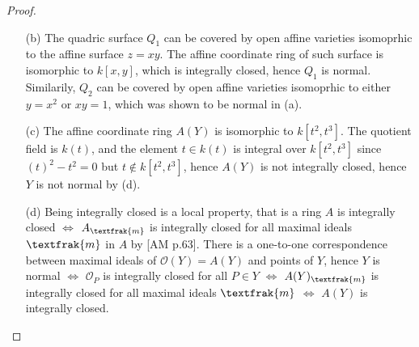\documentclass[12pt]{article}
\newcommand{\goth}[1]{\textfrak{#1}}
\newcommand{\OO}{\mathcal{O}}
\theoremstyle{definition}
\begin{document}
\begin{enumerate} [label=\textbf{\arabic*.}, leftmargin=-0.05em]
\begin{proof}
\begin{itemize}
    Now suppose $\Delta^2 = B^2 - 4AC \neq 0$ and assume $A \neq 0$, then we have
    \begin{equation*}
        f(x, y) = \bigg( \sqrt{A} x + \frac{B + \Delta}{2\sqrt{A}} y \bigg)  \bigg( \sqrt{A} x + \frac{B - \Delta}{2\sqrt{A}} y \bigg) + Dx + Ey + F,
    \end{equation*}
    so we can apply the affine transformation
    \begin{align*}
        \sqrt{A} x + \frac{B + \Delta}{2\sqrt{A}} y & \mapsto x \\
        \sqrt{A} x + \frac{B - \Delta}{2\sqrt{A}} y & \mapsto y
    \end{align*}
    which has determinant $1/\Delta \neq 0$, to obtain
    \begin{equation*}
        f'(x, y) = xy + (\text{linear terms}).
    \end{equation*}

    Since affine coordinate rings are invariant up to affine transformations, we have either $A(X) \simeq R$ or $A(X) \simeq S$. The ring $R = k[x, y] / (y - x^2)$ is isomorphic to a polynomial ring over one variable, which is a factorial, hence it is integrally closed. The ring $S = k[x, \frac{1}{x}]$ is a discrete valuation ring, which are integrally closed by [AM p.94].

    \item[(b)] The quadric surface $Q_1$ can be covered by open affine varieties isomoprhic to the affine surface $z = xy$. The affine coordinate ring of such surface is isomorphic to $k[x, y]$, which is integrally closed, hence $Q_1$ is normal. Similarily, $Q_2$ can be covered by open affine varieties isomoprhic to either $y = x^2$ or $xy = 1$, which was shown to be normal in (a).

    \item[(c)] The affine coordinate ring $A(Y)$ is isomorphic to $k[t^2, t^3]$. The quotient field is $k(t)$, and the element $t \in k(t)$ is integral over $k[t^2, t^3]$ since $(t)^2 - t^2 = 0$ but $t \notin k[t^2, t^3]$, hence $A(Y)$ is not integrally closed, hence $Y$ is not normal by (d).

    \item[(d)] Being integrally closed is a local property, that is a ring $A$ is integrally closed $\iff$ $A_\goth{m}$ is integrally closed for all maximal ideals $\goth{m}$ in $A$ by [AM p.63]. There is a one-to-one correspondence between maximal ideals of $\OO(Y) = A(Y)$ and points of $Y$, hence $Y$ is normal $\iff$ $\OO_P$ is integrally closed for all $P \in Y$ $\iff$ $A(Y)_{\goth{m}}$ is integrally closed for all maximal ideals $\goth{m}$ $\iff$ $A(Y)$ is integrally closed.


\end{itemize}
\end{proof}
\end{enumerate}
\end{document}
